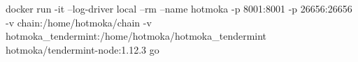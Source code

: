 \begin{shellcommandbox}\begin{ttlst}
docker run -it --log-driver local --rm --name hotmoka -p 8001:8001 -p 26656:26656 -v chain:/home/hotmoka/chain -v hotmoka_tendermint:/home/hotmoka/hotmoka_tendermint hotmoka/tendermint-node:1.12.3 go
\end{ttlst}\end{shellcommandbox}
